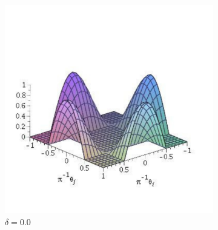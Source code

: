 \begin{figure} 
\caption{ 
    \textbf{Potencial de interação entre os agentes}  para diferentes
    valores de $\delta$ em função de $\theta_i$ e $\theta_j$, onde $h_{i,j}
    = \cos \theta_{i,j}$. 
}
\centering
\begin{subfigure}{.5\textwidth }
\includegraphics[width=\textwidth]{Figures/Vd0}
\caption{ $\delta = 0.0$}
\end{subfigure}
%
\begin{subfigure}{0.5\textwidth }
    \centering

\end{subfigure}
\end{figure}
